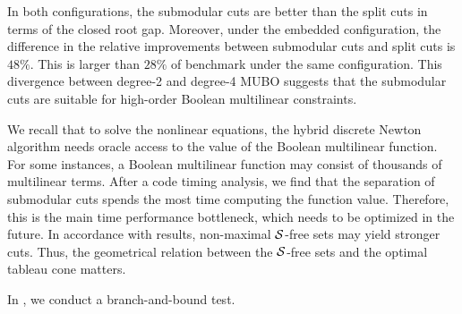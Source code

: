 In both configurations, the submodular cuts are better than the split cuts in terms of the closed root gap. Moreover, under the embedded configuration, the difference in the relative improvements between submodular cuts and split cuts  is  $48\%$. This is larger than $28\%$ of \maxcut benchmark under the same configuration. This divergence between degree-2 and degree-4 MUBO suggests that the submodular cuts are suitable for high-order Boolean multilinear constraints.

We recall that to solve the nonlinear equations, the hybrid discrete Newton algorithm needs oracle access to the value of the Boolean multilinear function. For some instances, a Boolean multilinear function may consist of thousands of multilinear terms. After  a code timing analysis, we find that the  separation of submodular cuts spends the most  time computing the function value. Therefore, this is the main time performance bottleneck, which needs to be  optimized in the future. In accordance with \maxcut results,  non-maximal $\mathcal S$-free sets may yield stronger cuts. Thus, the geometrical relation between the $\mathcal S$-free sets and the optimal tableau cone matters.

In , we conduct a branch-and-bound test.
\begin{table} [htbp]
\centering
{}
\caption{Summary of  \pbm results}\label{beta}
\end{table}


